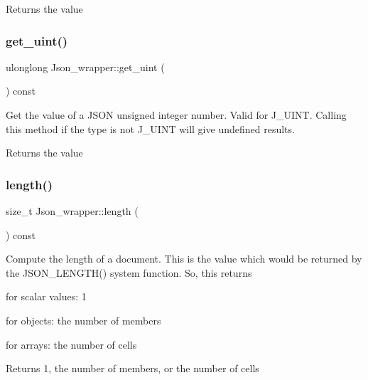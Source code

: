 \begin{DoxyReturn}{Returns}
the value 
\end{DoxyReturn}
\mbox{\label{classJson__wrapper_a3ad239e5ee5b2065ae220d62aacf8204}} 
\subsubsection{\texorpdfstring{get\+\_\+uint()}{get\_uint()}}
{\footnotesize\ttfamily ulonglong Json\+\_\+wrapper\+::get\+\_\+uint (\begin{DoxyParamCaption}{ }\end{DoxyParamCaption}) const}

Get the value of a J\+S\+ON unsigned integer number. Valid for J\+\_\+\+U\+I\+NT. Calling this method if the type is not J\+\_\+\+U\+I\+NT will give undefined results.

\begin{DoxyReturn}{Returns}
the value 
\end{DoxyReturn}
\mbox{\label{classJson__wrapper_ad69ab220db27a0ca1729a6bfcfeecc31}} 
\subsubsection{\texorpdfstring{length()}{length()}}
{\footnotesize\ttfamily size\+\_\+t Json\+\_\+wrapper\+::length (\begin{DoxyParamCaption}{ }\end{DoxyParamCaption}) const}

Compute the length of a document. This is the value which would be returned by the J\+S\+O\+N\+\_\+\+L\+E\+N\+G\+T\+H() system function. So, this returns


\begin{DoxyItemize}
\item for scalar values\+: 1
\item for objects\+: the number of members
\item for arrays\+: the number of cells
\end{DoxyItemize}

\begin{DoxyReturn}{Returns}
1, the number of members, or the number of cells 
\end{DoxyReturn}
\mbox{\label{classJson__wrapper_a2b45311d7b0dd662d38d548edaff25bd}} 
